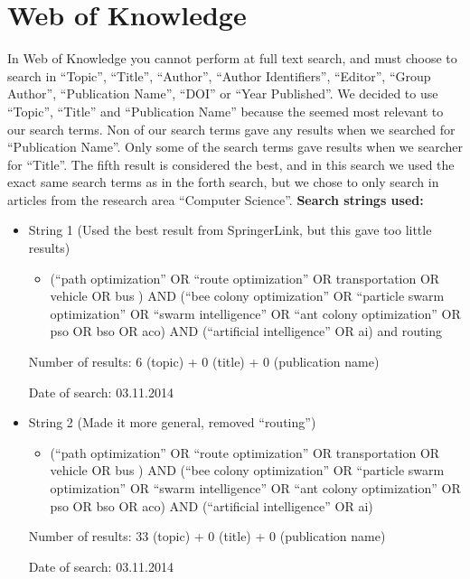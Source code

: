 \section{Web of Knowledge}
In Web of Knowledge you cannot perform at full text search, and must choose to search in “Topic”, “Title”, “Author”, “Author Identifiers”, “Editor”, “Group Author”, “Publication Name”, “DOI” or “Year Published”. We decided to use “Topic”, “Title” and “Publication Name” because the seemed most relevant to our search terms. Non of our search terms gave any results when we searched for “Publication Name”. Only some of the search terms gave results when we searcher for “Title”. The fifth result is considered the best, and in this search we used the exact same search terms as in the forth search, but we chose to only search in articles from the research area “Computer Science”. 
\newline
\textbf{Search strings used:}
\begin{itemize}
\item String 1 (Used the best result from SpringerLink, but this gave too little results)
\begin{itemize}
\item (``path optimization'' OR ``route optimization'' OR transportation OR vehicle OR bus ) AND (``bee colony optimization'' OR ``particle swarm optimization'' OR ``swarm intelligence'' OR ``ant colony optimization'' OR pso OR bso OR aco) AND (``artificial intelligence'' OR ai) and routing
\end{itemize}
\par
Number of results: 6 (topic) + 0 (title) + 0 (publication name)
\par
Date of search: 03.11.2014
\end{itemize}
\begin{itemize}
\item String 2 (Made it more general, removed ``routing'')
\begin{itemize}
\item (``path optimization'' OR ``route optimization'' OR transportation OR vehicle OR bus ) AND (``bee colony optimization'' OR ``particle swarm optimization'' OR ``swarm intelligence'' OR ``ant colony optimization'' OR pso OR bso OR aco) AND (``artificial intelligence'' OR ai)
\end{itemize}
\par
Number of results: 33 (topic) + 0 (title) + 0 (publication name)
\par
Date of search: 03.11.2014
\end{itemize}
